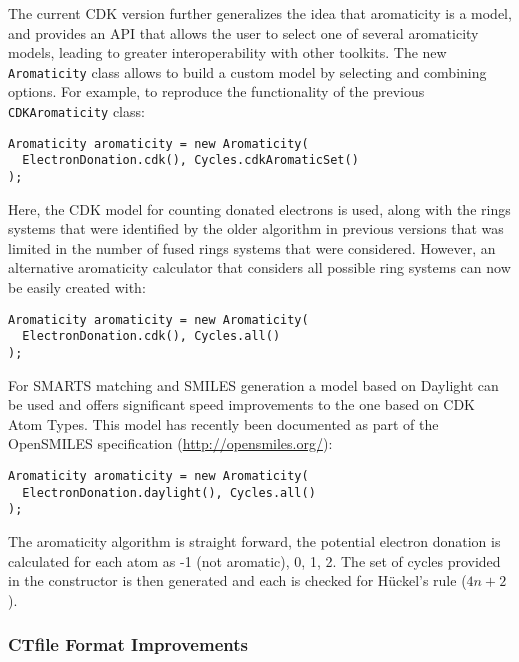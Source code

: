 \documentclass[doublespacing]{bmcart}
\begin{document}
The current CDK version further generalizes the idea that aromaticity
is a model, and provides an API that allows the user to select one of
several aromaticity models, leading to greater interoperability with
other toolkits. The new \texttt{Aromaticity} class allows to build a
custom model by selecting and combining options. For example, to
reproduce the functionality of the previous \texttt{CDKAromaticity} class:

\vspace{0.2cm}
\begin{verbatim}
Aromaticity aromaticity = new Aromaticity(
  ElectronDonation.cdk(), Cycles.cdkAromaticSet()
);
\end{verbatim}
\vspace{0.2cm}

Here, the CDK model for counting donated electrons is used, along with
the rings systems that were identified by the older algorithm in
previous versions that was limited in the number of fused rings
systems that were considered. However, an alternative aromaticity
calculator that considers all possible ring systems can now be
easily created with:

\vspace{0.2cm}
\begin{verbatim}
Aromaticity aromaticity = new Aromaticity(
  ElectronDonation.cdk(), Cycles.all()
);
\end{verbatim}
\vspace{0.2cm}

For SMARTS matching and SMILES generation a model based
on Daylight \cite{DaylightCIS} can be used and offers significant
speed improvements to the one based on CDK Atom Types. 
This model has recently been documented as part of the
OpenSMILES specification (\url{http://opensmiles.org/}):

\vspace{0.2cm}
\begin{verbatim}
Aromaticity aromaticity = new Aromaticity(
  ElectronDonation.daylight(), Cycles.all()
);
\end{verbatim}
\vspace{0.2cm}

The aromaticity algorithm is straight forward, the potential electron donation
is calculated for each atom as -1 (not aromatic), 0, 1, 2. The set of cycles
provided in the constructor is then generated and each is checked for H{\"u}ckel's 
rule ($4n+2$).

\subsubsection*{CTfile Format Improvements}
\end{document}
